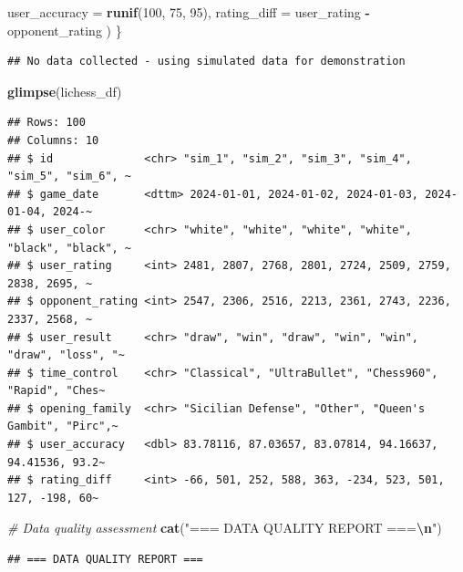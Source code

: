 \documentclass[
]{article}
\newenvironment{Shaded}{\begin{snugshade}}{\end{snugshade}}
\newcommand{\AttributeTok}[1]{\textcolor[rgb]{0.13,0.29,0.53}{#1}}
\newcommand{\CommentTok}[1]{\textcolor[rgb]{0.56,0.35,0.01}{\textit{#1}}}
\newcommand{\DecValTok}[1]{\textcolor[rgb]{0.00,0.00,0.81}{#1}}
\newcommand{\FunctionTok}[1]{\textcolor[rgb]{0.13,0.29,0.53}{\textbf{#1}}}
\newcommand{\NormalTok}[1]{#1}
\newcommand{\SpecialCharTok}[1]{\textcolor[rgb]{0.81,0.36,0.00}{\textbf{#1}}}
\newcommand{\StringTok}[1]{\textcolor[rgb]{0.31,0.60,0.02}{#1}}
\begin{document}
\begin{Shaded}
\begin{Highlighting}[]
    \AttributeTok{user\_accuracy =} \FunctionTok{runif}\NormalTok{(}\DecValTok{100}\NormalTok{, }\DecValTok{75}\NormalTok{, }\DecValTok{95}\NormalTok{),}
    \AttributeTok{rating\_diff =}\NormalTok{ user\_rating }\SpecialCharTok{{-}}\NormalTok{ opponent\_rating}
\NormalTok{  )}
\NormalTok{\}}
\end{Highlighting}
\end{Shaded}

\begin{verbatim}
## No data collected - using simulated data for demonstration
\end{verbatim}

\begin{Shaded}
\begin{Highlighting}[]
\FunctionTok{glimpse}\NormalTok{(lichess\_df)}
\end{Highlighting}
\end{Shaded}

\begin{verbatim}
## Rows: 100
## Columns: 10
## $ id              <chr> "sim_1", "sim_2", "sim_3", "sim_4", "sim_5", "sim_6", ~
## $ game_date       <dttm> 2024-01-01, 2024-01-02, 2024-01-03, 2024-01-04, 2024-~
## $ user_color      <chr> "white", "white", "white", "white", "black", "black", ~
## $ user_rating     <int> 2481, 2807, 2768, 2801, 2724, 2509, 2759, 2838, 2695, ~
## $ opponent_rating <int> 2547, 2306, 2516, 2213, 2361, 2743, 2236, 2337, 2568, ~
## $ user_result     <chr> "draw", "win", "draw", "win", "win", "draw", "loss", "~
## $ time_control    <chr> "Classical", "UltraBullet", "Chess960", "Rapid", "Ches~
## $ opening_family  <chr> "Sicilian Defense", "Other", "Queen's Gambit", "Pirc",~
## $ user_accuracy   <dbl> 83.78116, 87.03657, 83.07814, 94.16637, 94.41536, 93.2~
## $ rating_diff     <int> -66, 501, 252, 588, 363, -234, 523, 501, 127, -198, 60~
\end{verbatim}

\begin{Shaded}
\begin{Highlighting}[]
\CommentTok{\# Data quality assessment}
\FunctionTok{cat}\NormalTok{(}\StringTok{"=== DATA QUALITY REPORT ===}\SpecialCharTok{\textbackslash{}n}\StringTok{"}\NormalTok{)}
\end{Highlighting}
\end{Shaded}

\begin{verbatim}
## === DATA QUALITY REPORT ===
\end{verbatim}
\end{document}
